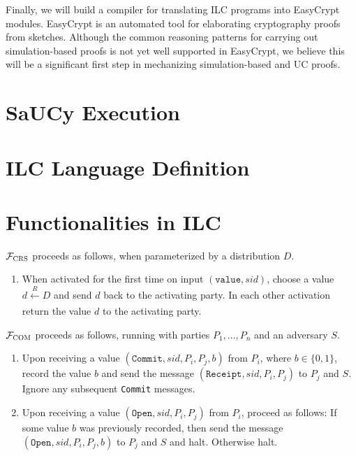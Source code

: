 \documentclass{llncs}
\begin{document}
Finally, we will build a compiler for translating ILC programs into
EasyCrypt~\cite{barthe2011computer} modules. EasyCrypt is an automated tool for
elaborating cryptography proofs from sketches. Although the common reasoning
patterns for carrying out simulation-based proofs is not yet well supported in
EasyCrypt, we believe this will be a significant first step in mechanizing
simulation-based and UC proofs.

\section{SaUCy Execution}



\section{ILC Language Definition}

\section{Functionalities in ILC}

\begin{func}[CRS]
    $\mathcal{F}_{\textsc{CRS}}$ proceeds as follows, when parameterized by a distribution $D$.
    \begin{enumerate}
        \item When activated for the first time on input $(\texttt{value}, sid)$, choose a value $d \xleftarrow[]{R} D$ and send $d$ back to the activating party. In each other activation return the value $d$ to the activating party.
    \end{enumerate}
\end{func}

\begin{ilc}[CRS]

\end{ilc}

\begin{func}[COM]
    $\mathcal{F}_{\textsc{COM}}$ proceeds as follows, running with parties $P_1, \ldots, P_n$ and an adversary $S$.
    \begin{enumerate}
        \item Upon receiving a value $(\texttt{Commit}, sid, P_i, P_j, b)$ from $P_i$, where $b \in \{ 0, 1 \}$, record the value $b$ and send the message $(\texttt{Receipt}, sid, P_i, P_j)$ to $P_j$ and $S$. Ignore any subsequent \texttt{Commit} messages.

        \item Upon receiving a value $(\texttt{Open}, sid, P_i, P_j)$ from $P_i$, proceed as follows: If some value $b$ was previously recorded, then send the message $(\texttt{Open}, sid, P_i, P_j, b)$ to $P_j$ and $S$ and halt. Otherwise halt.
    \end{enumerate}
\end{func}
\end{document}
